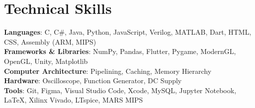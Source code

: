 \section{Technical Skills}
 \begin{itemize}[leftmargin=0.15in, label={}]
    \small{\item{
      \textbf{Languages}{: C, C\#, Java, Python, JavaScript, Verilog, MATLAB, Dart, HTML, CSS, Assembly (ARM,     MIPS)} \\
	   \textbf{Frameworks \& Libraries}{: NumPy, Pandas, Flutter, Pygame, ModernGL, OpenGL, Unity, Matplotlib} \\
      \textbf{Computer Architecture}{: Pipelining, Caching, Memory Hierarchy} \\
      \textbf{Hardware}{: Oscilloscope, Function Generator, DC Supply} \\
		 \textbf{Tools}{: Git, Figma, Visual Studio Code, Xcode, MySQL, Jupyter Notebook, LaTeX, Xilinx Vivado, LTspice, MARS MIPS} \\
       
    }}
 \end{itemize}